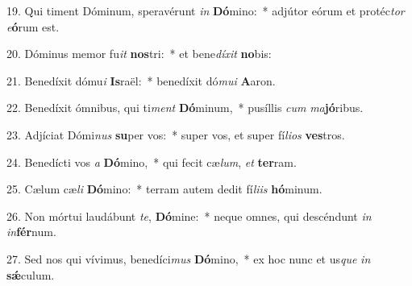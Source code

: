 19. Qui timent Dóminum, speravérunt \textit{in} \textbf{Dó}mino:~*  adjútor eórum et protéc\textit{tor} \textit{e}\textbf{ó}rum est.\

20. Dóminus memor fu\textit{it} \textbf{nos}tri:~*  et bene\textit{dí}\textit{xit} \textbf{no}bis:\

21. Benedíxit dómu\textit{i} \textbf{Is}raël:~*  benedíxit dó\textit{mu}\textit{i} \textbf{A}aron.\

22. Benedíxit ómnibus, qui ti\textit{ment} \textbf{Dó}minum,~*  pusíllis \textit{cum} \textit{ma}\textbf{jó}ribus.\

23. Adjíciat Dómi\textit{nus} \textbf{su}per vos:~*  super vos, et super fí\textit{li}\textit{os} \textbf{ves}tros.\

24. Benedícti vos \textit{a} \textbf{Dó}mino,~*  qui fecit cæ\textit{lum}, \textit{et} \textbf{ter}ram.\

25. Cælum cæ\textit{li} \textbf{Dó}mino:~*  terram autem dedit fí\textit{li}\textit{is} \textbf{hó}minum.\

26. Non mórtui laudábunt \textit{te}, \textbf{Dó}mine:~*  neque omnes, qui descéndunt \textit{in} \textit{in}\textbf{fér}num.\

27. Sed nos qui vívimus, benedíci\textit{mus} \textbf{Dó}mino,~*  ex hoc nunc et us\textit{que} \textit{in} \textbf{sǽ}culum.\

